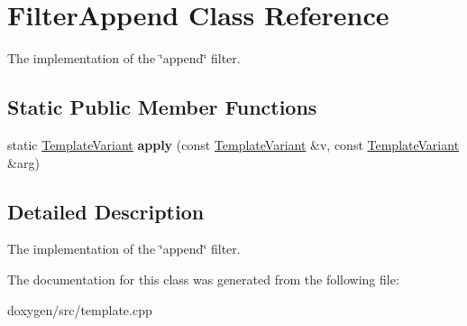 \hypertarget{class_filter_append}{}\section{Filter\+Append Class Reference}
\label{class_filter_append}


The implementation of the \char`\"{}append\char`\"{} filter.  


\subsection*{Static Public Member Functions}
\begin{DoxyCompactItemize}
\item 
\mbox{\label{class_filter_append_a97b5f8e69f2ebd947ab9bb6f77f1a1d8}} 
static \mbox{\hyperlink{class_template_variant}{Template\+Variant}} {\bfseries apply} (const \mbox{\hyperlink{class_template_variant}{Template\+Variant}} \&v, const \mbox{\hyperlink{class_template_variant}{Template\+Variant}} \&arg)
\end{DoxyCompactItemize}


\subsection{Detailed Description}
The implementation of the \char`\"{}append\char`\"{} filter. 

The documentation for this class was generated from the following file\+:\begin{DoxyCompactItemize}
\item 
doxygen/src/template.\+cpp\end{DoxyCompactItemize}
